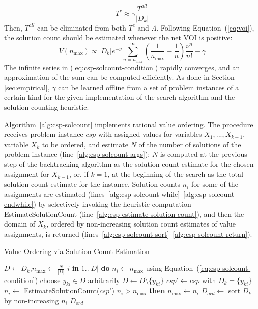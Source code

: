 \begin{equation}
\label{eq:csp-gamma}
T^c \approx \gamma \frac {T^{all}} {|D_k|}
\end{equation}
Then, $T^{all}$ can be eliminated from both $T^c$ and $\Lambda$. 
Following Equation~(\ref{eq:voi}), the solution count 
should be estimated whenever the net VOI is positive:
\begin{equation}
\label{eq:csp-solcount-condition}
V(n_\mathrm{max}) \propto |D_k|e^{-\nu}\sum_{n=n_\mathrm{max}}^\infty \! \! \left( \frac 1 {n_\mathrm{max}} - \frac 1 n\right) \frac {\nu^n} {n!}-\gamma
\end{equation}
The infinite series in
(\ref{eq:csp-solcount-condition}) rapidly converges, and an
approximation of the sum can be computed efficiently. As done
in Section \ref{sec:empirical}, $\gamma$ can be learned
offline from a set of problem instances of a certain kind for the
given implementation of the search algorithm and the solution counting
heuristic.

Algorithm~\ref{alg:csp-solcount} implements rational value ordering.
The procedure receives problem instance $csp$ with assigned values for
variables $X_1, ..., X_{k-1}$, variable $X_k$ to be ordered, and
estimate $N$ of the number of solutions of the problem instance
(line~\ref{alg:csp-solcount-args}); $N$ is computed at the previous
step of the backtracking algorithm as the solution count estimate for
the chosen assignment for $X_{k-1}$, or, if $k=1$, at the beginning of
the search as the total solution count estimate for the
instance. Solution counts $n_i$ for some of the assignments are
estimated (lines~\ref{alg:csp-solcount-while}--\ref{alg:csp-solcount-endwhile})
by selectively invoking the heuristic computation {\sc
  EstimateSolutionCount} (line~\ref{alg:csp-estimate-solution-count}),
and then the domain of $X_k$, ordered by non-increasing solution count
estimates of value assignments, is returned
(lines~\ref{alg:csp-solcount-sort}--\ref{alg:csp-solcount-return}).

\begin{algorithm}[h]
\caption{Value Ordering via Solution Count Estimation}
\label{alg:csp-solcount}
\begin{algorithmic}[1]
\label{alg:csp-solcount-args}
  \State $D \gets D_k$,\hspace{1em}$n_\mathrm{max} \gets \frac N {|D|}$
   {$i$ {\bf in} $1..|D|$} {\bf do} $n_i \gets n_\mathrm{max}$
   \label{alg:csp-solcount-while} \Comment using Equation~(\ref{eq:csp-solcount-condition})
    \State choose $y_{ki} \in D$ arbitrarily
    \State $D \gets D \setminus \{y_{ki}\}$
    \State $csp' \gets csp$ with $D_k=\{y_{ki}\}$
    \State $n_i \gets$ {\sc EstimateSolutionCount}($csp'$) \label{alg:csp-estimate-solution-count}
     {$n_i>n_\mathrm{max}$} {\bf then} $n_\mathrm{max} \gets n_i$
  \EndWhile \label{alg:csp-solcount-endwhile}
  \State $D_{ord} \gets$ sort $D_k$ by non-increasing $n_i$ \label{alg:csp-solcount-sort}
   $D_{ord}$ \label{alg:csp-solcount-return}
\EndProcedure
\end{algorithmic}
\end{algorithm}

